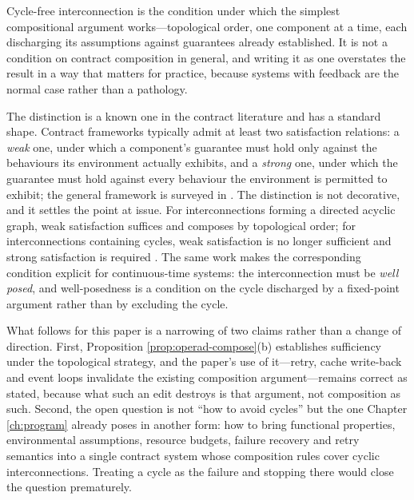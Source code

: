 \begin{remark}\label{rmk:cycles-composable}
Cycle-free interconnection is the condition under which the simplest compositional argument
works---topological order, one component at a time, each discharging its assumptions against
guarantees already established. It is not a condition on contract composition in general, and
writing it as one overstates the result in a way that matters for practice, because systems with
feedback are the normal case rather than a pathology.

The distinction is a known one in the contract literature and has a standard shape. Contract
frameworks typically admit at least two satisfaction relations: a \emph{weak} one, under which a
component's guarantee must hold only against the behaviours its environment actually exhibits, and a
\emph{strong} one, under which the guarantee must hold against every behaviour the environment is
permitted to exhibit; the general framework is surveyed in \cite{benveniste2018}. The distinction is
not decorative, and it settles the point at issue. For interconnections forming a directed acyclic
graph, weak satisfaction suffices and composes by topological order; for interconnections containing
cycles, weak satisfaction is no longer sufficient and strong satisfaction is required
\cite{agcontracts2021}. The same work makes the corresponding condition explicit for continuous-time
systems: the interconnection must be \emph{well posed}, and well-posedness is a condition on the cycle
discharged by a fixed-point argument rather than by excluding the cycle.

What follows for this paper is a narrowing of two claims rather than a change of direction.
First, Proposition \ref{prop:operad-compose}(b) establishes sufficiency under the topological
strategy, and the paper's use of it---retry, cache write-back and event loops invalidate the existing
composition argument---remains correct as stated, because what such an edit destroys is that argument,
not composition as such. Second, the open question is not ``how to avoid cycles'' but the one
Chapter \ref{ch:program} already poses in another form: how to bring functional properties,
environmental assumptions, resource budgets, failure recovery and retry semantics into a single
contract system whose composition rules cover cyclic interconnections. Treating a cycle as the
failure and stopping there would close the question prematurely.
\end{remark}

